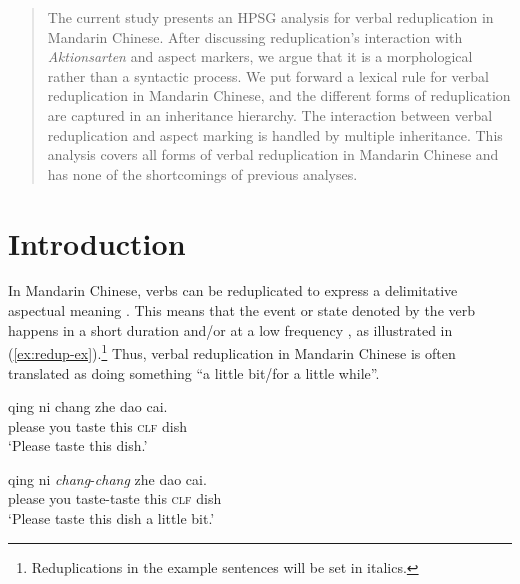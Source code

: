 \documentclass[11pt,a4paper,fleqn,draft]{article}
\let\textbf\emph
\begin{document}


\begin{abstract}

The current study presents an HPSG analysis for verbal reduplication in Mandarin Chinese. 
After discussing reduplication's interaction with \emph{Aktionsarten} and aspect markers, 
we argue that it is a morphological rather than a syntactic process.
We put forward a lexical rule for verbal reduplication in Mandarin Chinese,
and the different forms of reduplication are captured in an inheritance hierarchy.
The interaction between verbal reduplication and aspect marking is handled by multiple inheritance.
This analysis covers all forms of verbal reduplication in Mandarin Chinese 
and has none of the shortcomings of previous analyses.

\end{abstract}



\section{Introduction}\label{ch:intro}

In Mandarin Chinese, verbs can be reduplicated to express a delimitative aspectual meaning \citep[e.g.][]{Chao1968, Chen2001, Dai1997, Li1996, LiThompson1981, Tsao2001, XiaoMcEnery2004, Yang2003, Zhu1998}. 
This means that the event or state denoted by the verb happens in a short duration and/or at a low
frequency \citep[155]{XiaoMcEnery2004}, as illustrated in (\ref{ex:redup-ex}).\footnote{Reduplications
in the example sentences will be set in italics.}
Thus, verbal reduplication in Mandarin Chinese is often translated as doing something ``a little bit/for a little while”.

\setlength{\columnsep}{-27pt}
\ea\label{ex:redup-ex}
\begin{multicols}{2}
	\ea
	\gll qing ni chang zhe dao cai.\\
	please you taste this \textsc{clf} dish\\
	\glt `Please taste this dish.'
	
	\ex
	\gll qing ni \textbf{chang}-\textbf{chang} zhe dao cai.\\
	please you taste-taste this \textsc{clf} dish\\
	\glt `Please taste this dish a little bit.' 
	\z
\end{multicols}
\z
\end{document}
